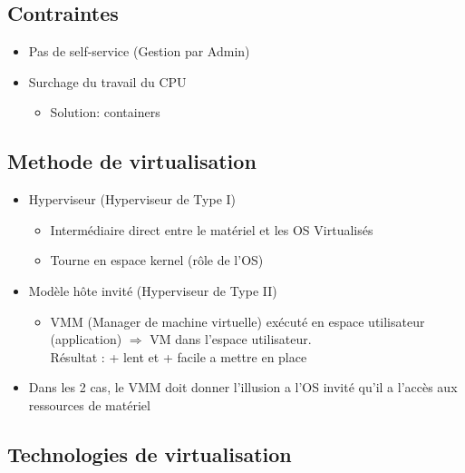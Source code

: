 \documentclass[a4paper]{article}
\begin{document}
    \subsection{Contraintes}

      \begin{itemize}
        \item Pas de self-service (Gestion par Admin)
        \item Surchage du travail du CPU
          \begin{itemize}
            \item Solution: containers 
          \end{itemize}
      \end{itemize}
    
    \subsection{Methode de virtualisation}

      \begin{itemize}
        \item Hyperviseur (Hyperviseur de Type I)
        \begin{itemize}
          \item Intermédiaire direct entre le matériel et les OS Virtualisés
          \item Tourne en espace kernel (rôle de l'OS)
        \end{itemize}

        \item Modèle hôte invité (Hyperviseur de Type II)
        \begin{itemize}
          \item VMM (Manager de machine virtuelle) exécuté en espace utilisateur (application) $\Rightarrow$ VM dans l'espace utilisateur.
          \\Résultat :
          + lent et + facile a mettre en place
        \end{itemize}
        \item Dans les 2 cas, le VMM doit donner l'illusion a l'OS invité qu'il a l'accès aux ressources de matériel
      \end{itemize}

    \subsection{Technologies de virtualisation}
\end{document}
